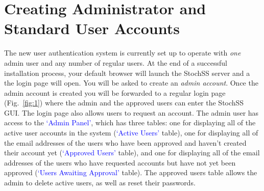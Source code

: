 \section{\label{sec:acc} Creating Administrator and Standard User Accounts}
The new user authentication system is currently set up to operate with \textit{one} admin user and any number of regular users. At the end of a successful installation process, your default browser will launch the StochSS server and a the login page will open. You will be asked to create an \textit{admin account}. Once the admin account is created you will be forwarded to a regular login page (Fig.~\ref{fig:1}) where the admin and the approved  users can enter the StochSS GUI. The  login page also allows  users to request an account. The admin user has access to the \textcolor{blue}{`Admin Panel'}, which has three tables: one for displaying all of the active user accounts in the system (\textcolor{blue}{`Active Users'} table), one for displaying all of the email addresses of the users who have been approved and haven't created their account yet (\textcolor{blue}{`Approved Users'} table), and one for displaying all of the email addresses of the users who have requested accounts but have not yet been approved (\textcolor{blue}{`Users Awaiting Approval'} table). The approved users table allows the admin to delete active users, as well as reset their passwords.

